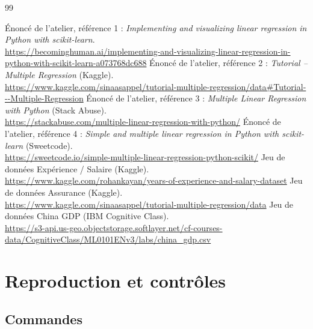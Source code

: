 \documentclass[11pt,a4paper]{report}
\begin{document}
\begin{thebibliography}{99}
  \'Enonc\'e de l'atelier, r\'ef\'erence 1 : \emph{Implementing and visualizing linear regression in Python with scikit-learn}.\\
  \url{https://becominghuman.ai/implementing-and-visualizing-linear-regression-in-python-with-scikit-learn-a073768dc688}
  \'Enonc\'e de l'atelier, r\'ef\'erence 2 : \emph{Tutorial -- Multiple Regression} (Kaggle).\\
  \url{https://www.kaggle.com/sinaasappel/tutorial-multiple-regression/data#Tutorial---Multiple-Regression}
  \'Enonc\'e de l'atelier, r\'ef\'erence 3 : \emph{Multiple Linear Regression with Python} (Stack Abuse).\\
  \url{https://stackabuse.com/multiple-linear-regression-with-python/}
  \'Enonc\'e de l'atelier, r\'ef\'erence 4 : \emph{Simple and multiple linear regression in Python with scikit-learn} (Sweetcode).\\
  \url{https://sweetcode.io/simple-multiple-linear-regression-python-scikit/}
  Jeu de donn\'ees Exp\'erience / Salaire (Kaggle).\\
  \url{https://www.kaggle.com/rohankayan/years-of-experience-and-salary-dataset}
  Jeu de donn\'ees Assurance (Kaggle).\\
  \url{https://www.kaggle.com/sinaasappel/tutorial-multiple-regression/data}
  Jeu de donn\'ees China GDP (IBM Cognitive Class).\\
  \url{https://s3-api.us-geo.objectstorage.softlayer.net/cf-courses-data/CognitiveClass/ML0101ENv3/labs/china_gdp.csv}
\end{thebibliography}

\appendix
\chapter{Reproduction et contr\^oles}

\section{Commandes}
\end{document}
